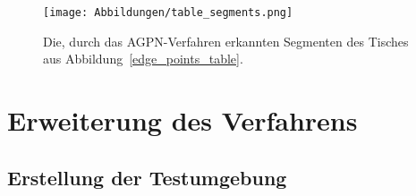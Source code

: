\begin{figure}[h]
	\texttt{[image: Abbildungen/table\_segments.png]}
	\centering
	\caption[Segmente eines Tisches]{Die, durch das AGPN-Verfahren erkannten Segmenten des Tisches aus Abbildung~\ref{edge_points_table}.}
	\label{segments_table}
\end{figure}


\section{Erweiterung des Verfahrens}
\subsection{Erstellung der Testumgebung} \label{Testumgebung}
